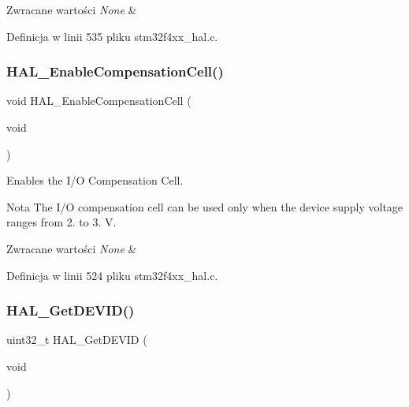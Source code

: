 \begin{DoxyRetVals}{Zwracane wartości}
{\em None} & \\
\hline
\end{DoxyRetVals}


Definicja w linii 535 pliku stm32f4xx\+\_\+hal.\+c.

\mbox{\label{group___h_a_l___exported___functions___group2_ga20b6ca07582e10aec5e15ad2fda7dfc1}} 
\subsubsection{\texorpdfstring{H\+A\+L\+\_\+\+Enable\+Compensation\+Cell()}{HAL\_EnableCompensationCell()}}
{\footnotesize\ttfamily void H\+A\+L\+\_\+\+Enable\+Compensation\+Cell (\begin{DoxyParamCaption}\item[{void}]{ }\end{DoxyParamCaption})}



Enables the I/O Compensation Cell. 

\begin{DoxyNote}{Nota}
The I/O compensation cell can be used only when the device supply voltage ranges from 2. to 3. V. 
\end{DoxyNote}

\begin{DoxyRetVals}{Zwracane wartości}
{\em None} & \\
\hline
\end{DoxyRetVals}


Definicja w linii 524 pliku stm32f4xx\+\_\+hal.\+c.

\mbox{\label{group___h_a_l___exported___functions___group2_gaff785f069ed650de77ff82ac407f7c84}} 
\subsubsection{\texorpdfstring{H\+A\+L\+\_\+\+Get\+D\+E\+V\+I\+D()}{HAL\_GetDEVID()}}
{\footnotesize\ttfamily uint32\+\_\+t H\+A\+L\+\_\+\+Get\+D\+E\+V\+ID (\begin{DoxyParamCaption}\item[{void}]{ }\end{DoxyParamCaption})}



